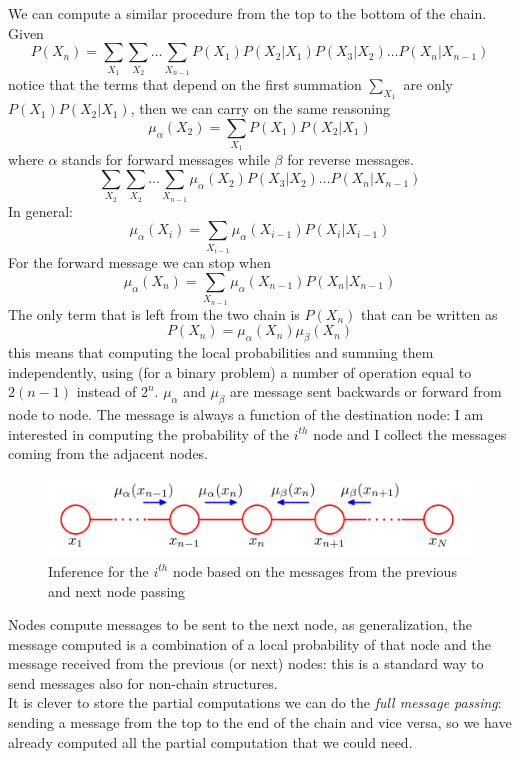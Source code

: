 We can compute a similar procedure from the top to the bottom of the chain. Given
\[
	P(X_{n}) = \sum_{X_1}\sum_{X_2}\dots \sum_{X_{n-1}}P(X_{1})P(X_{2}|X_{1})P(X_{3}
	|X_{2})\dots P(X_{n}|X_{n-1})
\]
notice that the terms that depend on the first summation $\sum_{X_1}$ are only $P
(X_{1})P(X_{2}|X_{1})$, then we can carry on the same reasoning
\[
	\mu_{\alpha} (X_{2}) = \sum_{X_1}P(X_{1})P(X_{2}|X_{1})
\]
where $\alpha$ stands for forward messages while $\beta$ for reverse messages.
\[
	\sum_{X_2}\sum_{X_2}\dots \sum_{X_{n-1}}\mu_{\alpha}(X_{2}) P(X_{3}|X_{2}) \dots
	P(X_{n}|X_{n-1})
\]
In general:
\[
	\mu_{\alpha} (X_{i}) = \sum_{X_{i-1}}\mu_{\alpha}(X_{i-1}) P(X_{i}|X_{i-1})
\]
For the forward message we can stop when
\[
	\mu_{\alpha} (X_{n}) = \sum_{X_{n-1}}\mu_{\alpha} (X_{n-1}) P(X_{n}|X_{n-1})
\]
The only term that is left from the two chain is $P(X_{n})$ that can be written
as
\[
	P(X_{n}) = \mu_{\alpha} (X_{n}) \mu_{\beta}(X_{n})
\]
this means that computing the local probabilities and summing them independently,
using (for a binary problem) a number of operation equal to $2(n-1)$ instead of $2
^{n}$. $\mu_{\alpha}$ and $\mu_{\beta}$ are message sent backwards or forward
from node to node. The message is always a function of the destination node: I
am interested in computing the probability of the $i^{th}$ node and I collect
the messages coming from the adjacent nodes.
\begin{figure}[H]
	\centering
	\includegraphics[scale=0.3]{
		images/09_BayesianNetworksInference_messagePassingChain.png
	}
	\caption{Inference for the $i^{th}$ node based on the messages from the
	previous and next node passing}
	\label{fig:message_passing_inference_BN_chain}
\end{figure}
Nodes compute messages to be sent to the next node, as generalization, the message
computed is a combination of a local probability of that node and the message received
from the previous (or next) nodes: this is a standard way to send messages also
for non-chain structures.\\

It is clever to store the partial computations we can do the \textit{full
message passing}: sending a message from the top to the end of the chain and vice
versa, so we have already computed all the partial computation that we could
need.\\

